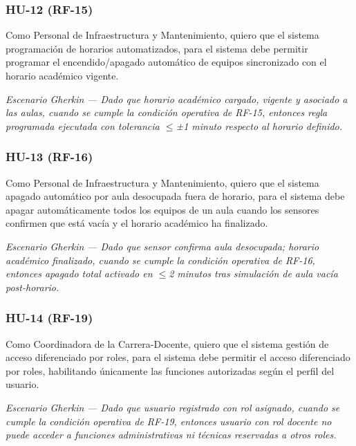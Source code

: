 \subsubsection*{HU-12 (RF-15)}


Como Personal de Infraestructura y Mantenimiento, quiero que el sistema programación de horarios automatizados, para el sistema debe permitir programar el encendido/apagado automático de equipos sincronizado con el horario académico vigente.


\textit{Escenario }\textit{Gherkin}\textit{ --- Dado que horario académico cargado, vigente y asociado a las aulas, cuando se cumple la condición operativa de RF-15, entonces regla programada ejecutada con tolerancia $\leq$±1 minuto respecto al horario definido.}


\subsubsection*{HU-13 (RF-16)}


Como Personal de Infraestructura y Mantenimiento, quiero que el sistema apagado automático por aula desocupada fuera de horario, para el sistema debe apagar automáticamente todos los equipos de un aula cuando los sensores confirmen que está vacía y el horario académico ha finalizado.


\textit{Escenario }\textit{Gherkin}\textit{ --- Dado que sensor confirma aula desocupada; horario académico finalizado, cuando se cumple la condición operativa de RF-16, entonces apagado total activado en $\leq$2 minutos tras simulación de aula vacía }\textit{post-horario}\textit{.}


\subsubsection*{HU-14 (RF-19)}


Como Coordinadora de la Carrera-Docente, quiero que el sistema gestión de acceso diferenciado por roles, para el sistema debe permitir el acceso diferenciado por roles, habilitando únicamente las funciones autorizadas según el perfil del usuario.


\textit{Escenario }\textit{Gherkin}\textit{ --- Dado que usuario registrado con rol asignado, cuando se cumple la condición operativa de RF-19, entonces usuario con rol docente no puede acceder a funciones administrativas ni técnicas reservadas a otros roles.}


